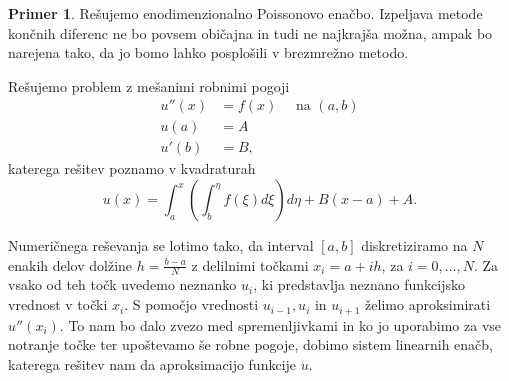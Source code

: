 \documentclass[12pt,a4paper,twoside]{article}
\theoremstyle{definition} %
\newtheorem{primer}[definicija]{Primer}
\theoremstyle{plain} %
\numberwithin{equation}{section}
\begin{document}
\begin{primer}
\label{prim:fdm}
Rešujemo enodimenzionalno Poissonovo enačbo. Izpeljava metode končnih diferenc
ne bo povsem običajna in tudi ne najkrajša možna, ampak bo narejena tako, da
jo bomo lahko posplošili v brezmrežno metodo.

Rešujemo problem z mešanimi robnimi pogoji
\begin{align}
  u''(x) &= f(x) \quad \text{ na } (a, b) \nonumber \\
  u(a) &= A  \label{eq:example-prob} \\
  u'(b) &= B, \nonumber
\end{align}
katerega rešitev poznamo v kvadraturah
\[
  u(x) = \int_a^x\left(\int_b^\eta f(\xi) d\xi \right) d\eta + B(x-a) + A.
\]

Numeričnega reševanja se lotimo tako, da interval $[a, b]$ diskretiziramo na $N$ enakih delov
dolžine $h = \frac{b-a}{N}$ z delilnimi točkami $x_i = a + i h$, za $i = 0, \dots, N$. Za vsako od
teh točk uvedemo neznanko $u_i$, ki predstavlja neznano funkcijsko vrednost v točki $x_i$. S pomočjo
vrednosti $u_{i-1}, u_i$ in $u_{i+1}$ želimo aproksimirati $u''(x_i)$. To nam bo dalo zvezo
med spremenljivkami in ko jo uporabimo za vse notranje točke ter upoštevamo še robne pogoje, dobimo
sistem linearnih enačb, katerega rešitev nam da aproksimacijo funkcije $u$.


\end{primer}
\end{document}
